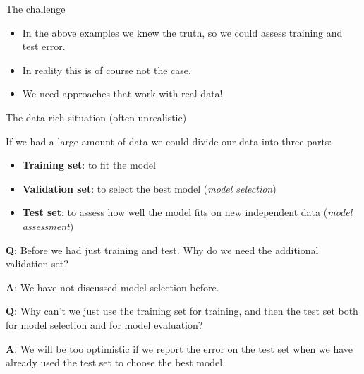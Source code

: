 \documentclass[
  10pt,
  ignorenonframetext,
]{beamer}
\providecommand{\tightlist}{%
  \setlength{\itemsep}{0pt}\setlength{\parskip}{0pt}}
\begin{document}
\begin{frame}
\begin{block}{The challenge}
\protect\hypertarget{the-challenge}{}
\(~\)

\begin{itemize}
\tightlist
\item
  In the above examples we knew the truth, so we could assess training
  and test error.
\end{itemize}

\vspace{2mm}

\begin{itemize}
\tightlist
\item
  In reality this is of course not the case.
\end{itemize}

\vspace{2mm}

\begin{itemize}
\tightlist
\item
  We need approaches that work with real data!
\end{itemize}
\end{block}
\end{frame}

\begin{frame}
\begin{block}{The data-rich situation (often unrealistic)}
\protect\hypertarget{the-data-rich-situation-often-unrealistic}{}
\vspace{2mm}

If we had a large amount of data we could divide our data into three
parts:

\begin{itemize}
\tightlist
\item
  \textbf{Training set}: to fit the model
\item
  \textbf{Validation set}: to select the best model (\emph{model
  selection})
\item
  \textbf{Test set}: to assess how well the model fits on new
  independent data (\emph{model assessment})
\end{itemize}

\vspace{2mm}

\textbf{Q}: Before we had just training and test. Why do we need the
additional validation set?

\textbf{A}: We have not discussed model selection before.

\vspace{2mm}

\textbf{Q}: Why can't we just use the training set for training, and
then the test set both for model selection and for model evaluation?

\textbf{A}: We will be too optimistic if we report the error on the test
set when we have already used the test set to choose the best model.
\end{block}
\end{frame}
\end{document}
